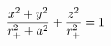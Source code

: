 \documentclass[preview]{standalone}
\begin{document}
\begin{align*}
\special{dvisvgm:raw <g id='unique000'>}\frac{x^2+y^2}{r_+^2+a^2} + \frac{z^2}{r_+^2} = 1\special{dvisvgm:raw </g>}
\end{align*}
\end{document}

